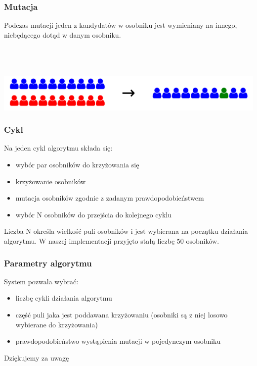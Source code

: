 \documentclass{beamer}
\begin{document}

\begin{frame}
\frametitle{Mutacja}
Podczas mutacji jeden z kandydatów w osobniku jest wymieniany na innego, niebędącego dotąd w danym osobniku.

~ \\ ~ \\ ~ \\

\includegraphics[width=0.8\paperwidth]{pics/mutation.png}

\end{frame}


\begin{frame}
\frametitle{Cykl}

Na jeden cykl algorytmu składa się:

\begin{itemize}
\item wybór par osobników do krzyżowania się
\item krzyżowanie osobników
\item mutacja osobników zgodnie z zadanym prawdopodobieństwem
\item wybór N osobników do przejścia do kolejnego cyklu
\end{itemize}

Liczba N określa wielkość puli osobników i jest wybierana na początku działania algorytmu. W naszej implementacji przyjęto stałą liczbę $50$ osobników.

\end{frame}


\begin{frame}
\frametitle{Parametry algorytmu}

System pozwala wybrać:
\begin{itemize}
\item liczbę cykli działania algorytmu
\item część puli jaka jest poddawana krzyżowaniu (osobniki są z niej losowo wybierane do krzyżowania)
\item prawdopodobieństwo wystąpienia mutacji w pojedynczym osobniku
\end{itemize}
\end{frame}



\begin{frame}
\Huge{\centerline{Dziękujemy za uwagę}}
\end{frame}

\end{document}
